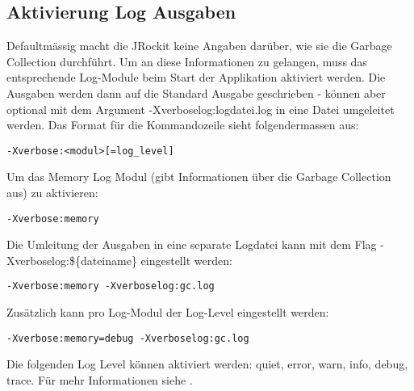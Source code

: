 \subsection{Aktivierung Log Ausgaben}
Defaultmässig macht die JRockit keine Angaben darüber, wie sie die Garbage Collection durchführt. Um an diese Informationen zu gelangen, muss das entsprechende Log-Module beim Start der Applikation aktiviert werden. Die Ausgaben werden dann auf die Standard Ausgabe geschrieben - können aber optional mit dem Argument -Xverboselog:logdatei.log in eine Datei umgeleitet werden. Das Format für die Kommandozeile sieht folgendermassen aus:

\begin{lstlisting}[caption=Format Aktivierung Log Modul]
-Xverbose:<modul>[=log_level]
\end{lstlisting}

Um das Memory Log Modul (gibt Informationen über die Garbage Collection aus) zu aktivieren:
\begin{lstlisting}[caption=Garbage Collection Log (Info)]
-Xverbose:memory
\end{lstlisting}

Die Umleitung der Ausgaben in eine separate Logdatei kann mit dem Flag -Xverboselog:\$\{dateiname\} eingestellt werden:
\begin{lstlisting}[caption=Garbage Collection Log (Info) - Umleitung in gc.log]
-Xverbose:memory -Xverboselog:gc.log 
\end{lstlisting}


Zusätzlich kann pro Log-Modul der Log-Level eingestellt werden:
\begin{lstlisting}[caption=Einstellung des Log-Levels]
-Xverbose:memory=debug -Xverboselog:gc.log 
\end{lstlisting}
Die folgenden Log Level können aktiviert werden: quiet, error, warn, info, debug, trace. Für mehr Informationen siehe \cite{oracleJRockitR28CLR}.


